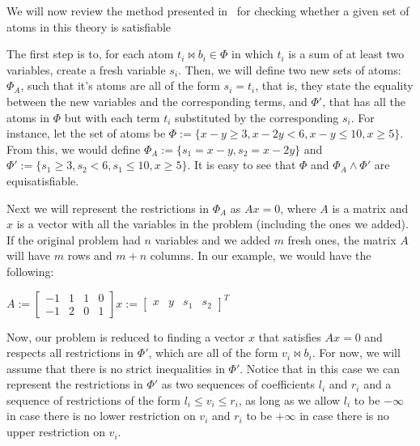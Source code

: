 We will now review the method presented in~\cite{simplex_dpllt} for checking whether a given set of atoms in this theory is satisfiable

The first step is to, for each atom $t_{i} \bowtie b_{i} \in \Phi$ in which $t_{i}$ is a sum of at least two variables, create a fresh variable $s_{i}$. Then, we will define two new sets of atoms: $\Phi_{A}$, such that it's atoms are all of the form $s_{i} = t_{i}$, that is, they state the equality between the new variables and the corresponding terms, and $\Phi'$, that has all the atoms in $\Phi$ but with each term $t_{i}$ substituted by the corresponding $s_{i}$. For instance, let the set of atoms be
$\Phi := \{x - y \ge 3, x - 2y < 6, x - y \le 10, x \ge 5\}$.  From this, we would define $\Phi_{A} := \{s_{1} = x - y, s_{2} = x - 2y\}$ and $\Phi' := \{s_{1} \ge 3, s_{2} < 6, s_{1} \le 10, x \ge 5\}$. It is easy to see that $\Phi$ and $\Phi_{A} \wedge \Phi'$ are equisatisfiable.

Next we will represent the restrictions in $\Phi_{A}$ as $Ax = 0$, where $A$ is a matrix and $x$ is a vector with all the variables in the problem (including the ones we added). If the original problem had $n$ variables and we added $m$ fresh ones, the matrix $A$ will have $m$ rows and $m + n$ columns. In our example, we would have the following:

\begin{center}
$
A :=
\begin{bmatrix}
  -1 & 1 & 1 & 0 \\
  -1 & 2 & 0 & 1
\end{bmatrix}
x :=
\begin{bmatrix}
  x & y & s_{1} & s_{2}
\end{bmatrix}^{T}
$
\end{center}

Now, our problem is reduced to finding a vector $x$ that satisfies $Ax = 0$ and respects all restrictions in $\Phi'$, which are all of the form $v_{i} \bowtie b_{i}$. For now, we will assume that there is no strict inequalities in $\Phi'$. Notice that in this case we can represent the restrictions in $\Phi'$ as two sequences of coefficients $l_{i}$ and $r_{i}$ and a sequence of restrictions of the form $l_{i} \le v_{i} \le r_{i}$, as long as we allow $l_{i}$ to be $-\infty$ in case there is no lower restriction on $v_{i}$ and $r_{i}$ to be $+\infty$ in case there is no upper restriction on $v_{i}$.

